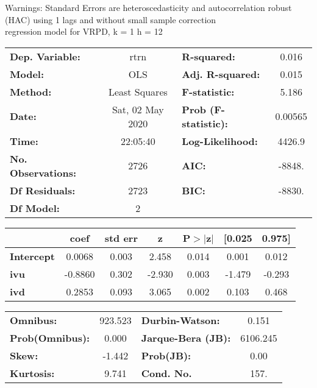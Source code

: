 Warnings: \newline
 [1] Standard Errors are heteroscedasticity and autocorrelation robust (HAC) using 1 lags and without small sample correction\\ 

regression model for VRPD, k = 1 h = 12\begin{center}
\begin{tabular}{lclc}
\toprule
\textbf{Dep. Variable:}    &       rtrn       & \textbf{  R-squared:         } &     0.016   \\
\textbf{Model:}            &       OLS        & \textbf{  Adj. R-squared:    } &     0.015   \\
\textbf{Method:}           &  Least Squares   & \textbf{  F-statistic:       } &     5.186   \\
\textbf{Date:}             & Sat, 02 May 2020 & \textbf{  Prob (F-statistic):} &  0.00565    \\
\textbf{Time:}             &     22:05:40     & \textbf{  Log-Likelihood:    } &    4426.9   \\
\textbf{No. Observations:} &        2726      & \textbf{  AIC:               } &    -8848.   \\
\textbf{Df Residuals:}     &        2723      & \textbf{  BIC:               } &    -8830.   \\
\textbf{Df Model:}         &           2      & \textbf{                     } &             \\
\bottomrule
\end{tabular}
\begin{tabular}{lcccccc}
                   & \textbf{coef} & \textbf{std err} & \textbf{z} & \textbf{P$> |$z$|$} & \textbf{[0.025} & \textbf{0.975]}  \\
\midrule
\textbf{Intercept} &       0.0068  &        0.003     &     2.458  &         0.014        &        0.001    &        0.012     \\
\textbf{ivu}       &      -0.8860  &        0.302     &    -2.930  &         0.003        &       -1.479    &       -0.293     \\
\textbf{ivd}       &       0.2853  &        0.093     &     3.065  &         0.002        &        0.103    &        0.468     \\
\bottomrule
\end{tabular}
\begin{tabular}{lclc}
\textbf{Omnibus:}       & 923.523 & \textbf{  Durbin-Watson:     } &    0.151  \\
\textbf{Prob(Omnibus):} &   0.000 & \textbf{  Jarque-Bera (JB):  } & 6106.245  \\
\textbf{Skew:}          &  -1.442 & \textbf{  Prob(JB):          } &     0.00  \\
\textbf{Kurtosis:}      &   9.741 & \textbf{  Cond. No.          } &     157.  \\
\bottomrule
\end{tabular}
\end{center}

